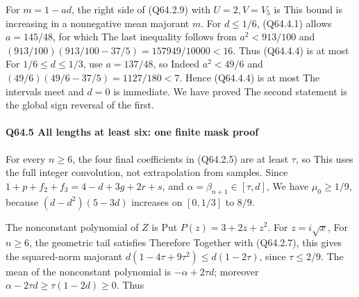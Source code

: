 For \(m=1-ad\), the right side of (Q64.2.9) with \(U=2,\allowbreak  V=V_5\) is
This bound is increasing in a nonnegative mean majorant \(m\).
For \(d\le1/6\), (Q64.4.1) allows \(a=145/48\), for which
The last inequality follows from \(a^2<913/100\) and
\((913/100)(913/100-37/5)=157949/10000<16\).
Thus (Q64.4.4) is at most
For \(1/6\le d\le1/3\), use \(a=137/48\), so
Indeed \(a^2<49/6\) and
\((49/6)(49/6-37/5)=1127/180<7\). Hence (Q64.4.4) is at most
The intervals meet and \(d=0\) is immediate. We have proved
The second statement is the global sign reversal of the first.

\paragraph{Q64.5 All lengths at least six: one finite mask proof}

For every \(n\ge6\), the four final coefficients in (Q64.2.5) are at least
\(\tau\), so
This uses the full integer convolution, not extrapolation from samples.
Since \(1+p+f_2+f_3=4-d+3g+2r+s\), and
\(\alpha=\beta_{n+1}\in[\tau,\allowbreak  d]\),
We have \(\mu_0\ge1/9\), because
\((d-d^2)(5-3d)\) increases on \([0,\allowbreak  1/3]\) to \(8/9\).

The nonconstant polynomial of \(Z\) is
Put \(P(z)=3+2z+z^2\). For \(z=i\sqrt{x}\),
For \(n\ge6\), the geometric tail satisfies
Therefore
Together with (Q64.2.7), this gives the squared-norm majorant
\(d(1-4\tau+9\tau^2)\le d(1-2\tau)\), since \(\tau\le2/9\).
The mean of the nonconstant polynomial is \(-\alpha+2\tau d\);
moreover \(\alpha-2\tau d\ge\tau(1-2d)\ge0\). Thus

